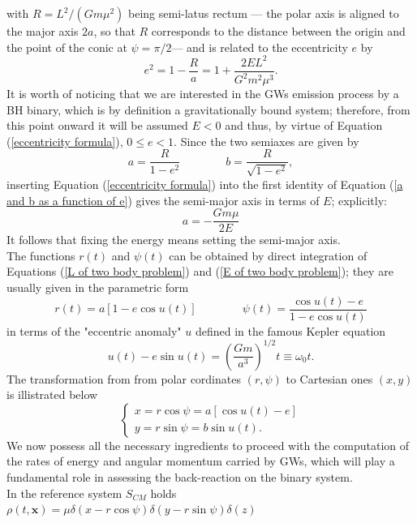 \documentclass[12pt,twoside,openany]{book}
\begin{document}
with $R=L^2/(Gm\mu^2)$ being semi-latus rectum --- the polar axis is aligned to the major axis $2a$, so that 
$R$ corresponds to the distance between the origin and the point of the conic at $\psi=\pi/2$--- and is related to the eccentricity $e$ by 
\begin{equation}\label{eccentricity formula}
    e^2=1-\frac{R}{a}=1+\frac{2EL^2}{G^2m^2\mu^3}.
\end{equation}
It is worth of noticing that we are interested in the GWs emission process by a BH binary, which is by definition a gravitationally bound system; therefore, from this point onward it will be assumed $E<0$ and thus, by virtue of Equation (\ref{eccentricity formula}), $0\le e<1$.
Since the two semiaxes are given by
\begin{equation}\label{a and b as a function of e}
    a=\frac{R}{1-e^2} \qquad \qquad b=\frac{R}{\sqrt{1-e^2}},
\end{equation}
inserting Equation (\ref{eccentricity formula}) into the first identity of Equation (\ref{a and b as a function of e}) gives the semi-major axis in terms of $E$; explicitly:
\begin{equation}\label{a as a function of E}
    a=-\frac{Gm\mu}{2E}
\end{equation}
It follows that fixing the energy means setting the semi-major axis.\\The functions $r(t)$ and $\psi(t)$ can be obtained by direct integration of Equations (\ref{L of two body problem}) and (\ref{E of two body problem}); they are usually given in the parametric form
\begin{equation}
    r(t)=a[1-e\cos{u(t)}] \qquad \qquad\psi(t)=\frac{\cos{u(t)}-e}{1-e\cos{u(t)}}
\end{equation}
in terms of the "eccentric anomaly" $u$ defined in the famous Kepler equation
\begin{equation}
    u(t)-e\sin{u(t)}=\left(\frac{Gm}{a^3}\right)^{1/2}t\equiv \omega_0 t.
\end{equation}
The transformation from from polar cordinates $(r,\psi)$ to Cartesian ones $(x,y)$ is illistrated below
\begin{equation}
\begin{cases}
x = r \cos\psi = a\left[\cos u(t) - e\right] \\
y = r \sin\psi = b \sin u(t) .
\end{cases}
\end{equation}
We now possess all the necessary ingredients to proceed with the computation of the rates of energy and angular momentum carried by GWs, which will play a fundamental role in assessing the back-reaction on the binary system.\\In the reference system $S_{CM}$ holds $\rho(t,\mathbf{x})=\mu\delta(x-r\cos{\psi})\delta(y-r\sin{\psi})\delta(z)$
\end{document}
